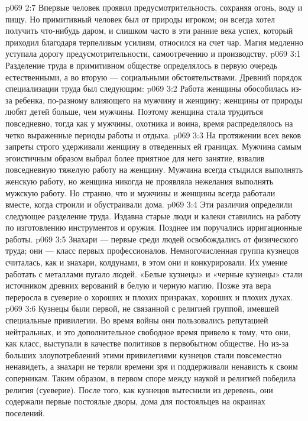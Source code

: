 \vs p069 2:7 Впервые человек проявил предусмотрительность, сохраняя огонь, воду и пищу. Но примитивный человек был от природы игроком; он всегда хотел получить что\hyp{}нибудь даром, и слишком часто в эти ранние века успех, который приходил благодаря терпеливым усилиям, относился на счет чар. Магия медленно уступала дорогу предусмотрительности, самоотречению и производству.
\vs p069 3:1 Разделение труда в примитивном обществе определялось в первую очередь естественными, а во вторую --- социальными обстоятельствами. Древний порядок специализации труда был следующим:
\vs p069 3:2 \bibnobreakspace {} Работа женщины обособилась из\hyp{}за ребенка, по\hyp{}разному влияющего на мужчину и женщину; женщины от природы любят детей больше, чем мужчины. Поэтому женщина стала трудиться повседневно, тогда как у мужчины, охотника и воина, время распределялось на четко выраженные периоды работы и отдыха.
\vs p069 3:3 \pc На протяжении всех веков запреты строго удерживали женщину в отведенных ей границах. Мужчина самым эгоистичным образом выбрал более приятное для него занятие, взвалив повседневную тяжелую работу на женщину. Мужчина всегда стыдился выполнять женскую работу, но женщина никогда не проявляла нежелания выполнять мужскую работу. Но странно, что и мужчины и женщины всегда работали вместе, когда строили и обустраивали дома.
\vs p069 3:4 \bibnobreakspace {} Эти различия определили следующее разделение труда. Издавна старые люди и калеки ставились на работу по изготовлению инструментов и оружия. Позднее им поручались ирригационные работы.
\vs p069 3:5 \bibnobreakspace {} Знахари --- первые среди людей освобождались от физического труда; они --- класс первых профессионалов. Немногочисленная группа кузнецов считалась, как и знахари, колдунами, в этом они и конкурировали. Их умение работать с металлами пугало людей. «Белые кузнецы» и «черные кузнецы» стали источником древних верований в белую и черную магию. Позже эта вера переросла в суеверие о хороших и плохих призраках, хороших и плохих духах.
\vs p069 3:6 Кузнецы были первой, не связанной с религией группой, имевшей специальные привилегии. Во время войны они пользовались репутацией нейтральных, и это дополнительное свободное время привело к тому, что они, как класс, выступали в качестве политиков в первобытном обществе. Но из\hyp{}за больших злоупотреблений этими привилегиями кузнецов стали повсеместно ненавидеть, а знахари не теряли времени зря и поддерживали ненависть к своим соперникам. Таким образом, в первом споре между наукой и религией победила религия (суеверие). После того, как кузнецов вытеснили из деревень, они содержали первые постоялые дворы, дома для постояльцев на окраинах поселений.
